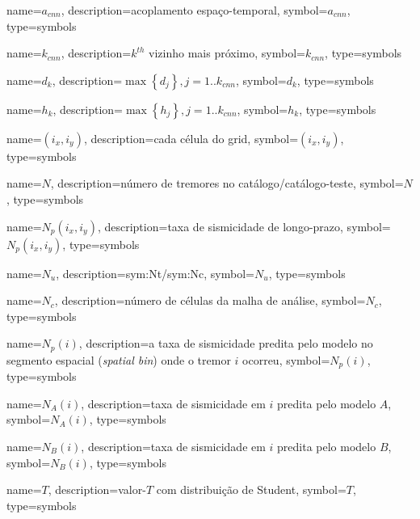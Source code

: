 {
	name={\ensuremath{a_{cnn}}},
	description={acoplamento espaço-temporal},
	symbol={\ensuremath{a_{cnn}}},
	type=symbols
}

{
	name={\ensuremath{k_{cnn}}},
	description={$k^{th}$ vizinho mais próximo},
	symbol={\ensuremath{k_{cnn}}},
	type=symbols
}


{
	name={\ensuremath{d_k}},
	description={$\max{\left\{ d_j \right\}}, j=1.. k_{cnn}$},
	symbol={\ensuremath{d_k}},
	type=symbols
}

{
	name={\ensuremath{h_k}},
	description={$\max{\left\{ h_j \right\} }, j=1.. k_{cnn}$},
	symbol={\ensuremath{h_k}},
	type=symbols
}

{
	name={\ensuremath{\left(i_x, i_y\right)}},
	description={cada célula do grid},
	symbol={\ensuremath{\left(i_x, i_y\right)}},
	type=symbols
}


{
	name={\ensuremath{N}},
	description={número de tremores no catálogo/catálogo-teste},
	symbol={\ensuremath{N}},
	type=symbols
}



{
	name={\ensuremath{N_p\left(i_x, i_y\right)}},
	description={taxa de sismicidade de longo-prazo},
	symbol={\ensuremath{N_p\left(i_x, i_y\right)}},
	type=symbols
}


{
	name={\ensuremath{N_u}},
	description={\gls{sym:Nt}/\gls{sym:Nc}},
	symbol={\ensuremath{N_u}},
	type=symbols
}


{
	name={\ensuremath{N_c}},
	description={número de células da malha de análise},
	symbol={\ensuremath{N_c}},
	type=symbols
}


{
	name={\ensuremath{N_p(i)}},
	description={a taxa de sismicidade predita pelo modelo no segmento espacial (\emph{spatial bin}) onde o tremor $i$
	ocorreu}, symbol={\ensuremath{N_p(i)}},
	type=symbols
}


{
	name={\ensuremath{N_A(i)}},
	description={taxa de sismicidade em $i$ predita pelo modelo $A$}, 
	symbol={\ensuremath{N_A(i)}},
	type=symbols
}


{
	name={\ensuremath{N_B(i)}},
	description={taxa de sismicidade em $i$ predita pelo modelo $B$},
	symbol={\ensuremath{N_B(i)}},
	type=symbols
}


{
	name={\ensuremath{T}},
	description={valor-$T$ com distribuição de Student},
	symbol={\ensuremath{T}},
	type=symbols
}

